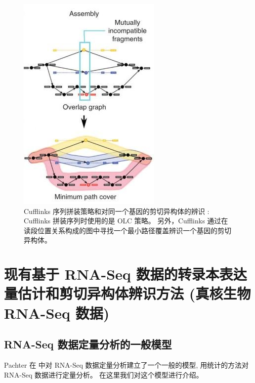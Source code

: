\begin{figure}[!t]
\centering
\includegraphics[height=0.5\textheight]{figures/cufflinks-assembly.jpg}
\caption[Cufflinks 序列拼装策略和对同一个基因的剪切异构体的辨识 \cite{cufflinks.2010}]
{Cufflinks 序列拼装策略和对同一个基因的剪切异构体的辨识 \cite{cufflinks.2010}: 
Cufflinks 拼装序列时使用的是 OLC 策略。
另外，Cufflinks 通过在读段位置关系构成的图中寻找一个最小路径覆盖辨识一个基因的剪切异构体。}
\label{intro-cufflinks-assembly}
\end{figure}


\section{现有基于 RNA-Seq 数据的转录本表达量估计和剪切异构体辨识方法 (真核生物 RNA-Seq 数据)}
\label{intro-rna-seq-tools-summary}

\subsection{RNA-Seq 数据定量分析的一般模型}
\label{rna-seq-general-model}

Pachter 在  中对 RNA-Seq 
数据定量分析建立了一个一般的模型, 
用统计的方法对 RNA-Seq 数据进行定量分析。 在这里我们对这个模型进行介绍。 


